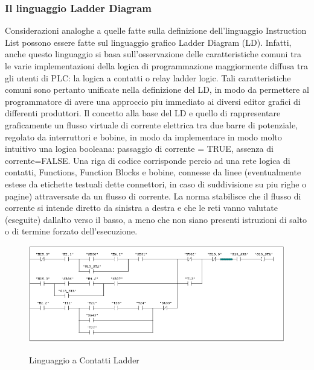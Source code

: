 \documentclass[12pt, a4paper, oneside]{book}
\begin{document}
\subsubsection{Il linguaggio Ladder Diagram}
Considerazioni analoghe a quelle fatte sulla definizione dell’linguaggio Instruction List possono essere fatte sul linguaggio grafico Ladder Diagram (LD). Infatti, anche questo linguaggio si basa sull’osservazione delle caratteristiche comuni tra le varie implementazioni della logica di programmazione maggiormente diffusa tra gli utenti di PLC: la logica a contatti o relay ladder logic. Tali caratteristiche comuni sono pertanto unificate nella definizione del LD, in modo da permettere al programmatore di avere una approccio piu immediato ai diversi editor grafici di differenti produttori. Il concetto alla base del LD e quello di rappresentare graficamente un flusso virtuale di corrente elettrica tra due barre di potenziale, regolato da interruttori e bobine, in modo da implementare in modo molto intuitivo una logica booleana: passaggio di corrente = TRUE, assenza di corrente=FALSE. Una riga di codice corrisponde percio ad una rete logica di contatti, Functions, Function Blocks e bobine, connesse da linee (eventualmente estese da etichette testuali dette connettori, in caso di suddivisione su piu righe o pagine) attraversate da un flusso di corrente. La norma stabilisce che il flusso di corrente si intende diretto da sinistra a destra e che le reti vanno valutate (eseguite) dallalto
verso il basso, a meno che non siano presenti istruzioni di salto o di termine forzato dell’esecuzione.

	\begin{figure}[H]
	\centering
	\includegraphics[width=12cm]{Immagini/LAD}
	\label{LAD}
	\caption{Linguaggio a Contatti Ladder}
\end{figure}
\end{document}
